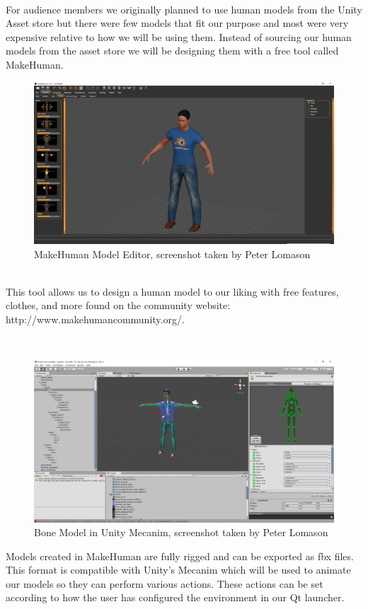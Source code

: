 \documentclass[a4paper,10pt]{article}
\begin{document}
\par~\\
For audience members we originally planned to use human models from the Unity Asset store but there were few models that fit our purpose and most were very expensive relative to how we will be using them. Instead of sourcing our human models from the asset store we will be designing them with a free tool called MakeHuman. 
\begin{figure}[H] %
	\centerline {\includegraphics[scale = 0.28]{makeHuman.png}}
	\caption{MakeHuman Model Editor, screenshot taken by Peter Lomason}
	\label{fig:makeHuman}
\end{figure}
\par~\\
This tool allows us to design a human model to our liking with free features, clothes, and more found on the community website: http://www.makehumancommunity.org/.
\par~\\
\begin{figure}[H] %
	\centerline {\includegraphics[scale = 0.28]{unityMecanim.png}}
	\caption{Bone Model in Unity Mecanim, screenshot taken by Peter Lomason}
	\label{fig:unityMecanim}
\end{figure}
Models created in MakeHuman are fully rigged and can be exported as fbx files. This format is compatible with Unity's Mecanim which will be used to animate our models so they can perform various actions. These actions can be set according to how the user has configured the environment in our Qt launcher.
\end{document}

